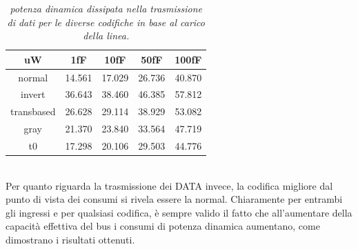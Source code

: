 \begin{table}[!h]\footnotesize
	\centering
	\begin{tabular}{|c|c|c|c|c|}
		\hline
		\textbf{uW} & \textbf{1fF} & \textbf{10fF} & \textbf{50fF} & \textbf{100fF}\\
		\hline
		normal & 14.561 & 17.029 & 26.736 & 40.870\\
		invert & 36.643 & 38.460 & 46.385  & 57.812\\
		transbased & 26.628 & 29.114 & 38.929 & 53.082\\
		gray & 21.370 & 23.840 & 33.564 & 47.719\\              
		t0 & 17.298 & 20.106 & 29.503 & 44.776\\
		\hline
	\end{tabular}
	\caption{\textit{potenza dinamica dissipata nella trasmissione di dati per le diverse codifiche in base al carico della linea.}}
	\label{Tab10}
\end{table}
\\
Per quanto riguarda la trasmissione dei DATA invece, la codifica migliore dal punto di vista dei consumi si rivela essere la normal.
Chiaramente per entrambi gli ingressi e per qualsiasi codifica, è sempre valido il fatto che all'aumentare della capacità effettiva del bus i consumi di potenza dinamica aumentano, come dimostrano i risultati ottenuti.
\\
